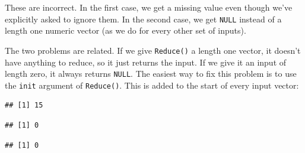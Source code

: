 These are incorrect. In the first case, we get a missing value even
though we've explicitly asked to ignore them. In the second case, we get
\texttt{NULL} instead of a length one numeric vector (as we do for every
other set of inputs).

The two problems are related. If we give \texttt{Reduce()} a length one
vector, it doesn't have anything to reduce, so it just returns the
input. If we give it an input of length zero, it always returns
\texttt{NULL}. The easiest way to fix this problem is to use the
\texttt{init} argument of \texttt{Reduce()}. This is added to the start
of every input vector:

\begin{Shaded}
\begin{Highlighting}[]
\StringTok{ } \NormalTok{) \{}
  \NormalTok{(} \NormalTok{)}
\NormalTok{\}}
\NormalTok{(}\NormalTok{(}\NormalTok{, }\NormalTok{, }\NormalTok{))}
\end{Highlighting}
\end{Shaded}

\begin{verbatim}
## [1] 15
\end{verbatim}

\begin{Shaded}
\begin{Highlighting}[]
\NormalTok{(}\NormalTok{, } \NormalTok{)}
\end{Highlighting}
\end{Shaded}

\begin{verbatim}
## [1] 0
\end{verbatim}

\begin{Shaded}
\begin{Highlighting}[]
\NormalTok{(}\NormalTok{())}
\end{Highlighting}
\end{Shaded}

\begin{verbatim}
## [1] 0
\end{verbatim}

